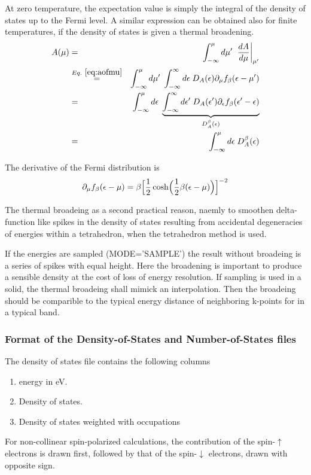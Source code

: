\documentclass[final,12pt]{article}
\begin{document}
{{{{{{At zero  temperature, the expectation  value is simply the  integral of
the density of states up to  the Fermi level. A similar expression can
be obtained also for finite temperatures,  if the density of states is
given a thermal broadening.
\begin{eqnarray}
A(\mu)
&=&\int_{-\infty}^\mu d\mu'\;\left.\frac{dA}{d\mu}\right|_{\mu'}
\nonumber\\
&\stackrel{Eq.~\ref{eq:aofmu}}{=}&
\int_{-\infty}^\mu d\mu'\;
\int_{-\infty}^\infty d\epsilon\; D_A(\epsilon) \partial_\mu 
f_\beta(\epsilon-\mu')
\nonumber\\
&=&\int_{-\infty}^\mu d\epsilon\;
\underbrace{
\int_{-\infty}^\infty d\epsilon'\; D_A(\epsilon') \partial_\epsilon 
f_\beta(\epsilon'-\epsilon)}
_{D_A^{\beta}(\epsilon)}
\nonumber\\
&=&\int_{-\infty}^\mu d\epsilon\;D^\beta_A(\epsilon)
\end{eqnarray}

The derivative of the Fermi distribution is
\begin{eqnarray}
\partial_\mu f_\beta(\epsilon-\mu)
=\beta\Bigl[\frac{1}{2}
\cosh\Bigl(\frac{1}{2}\beta(\epsilon-\mu)\Bigr)\Bigr]^{-2}
\end{eqnarray}

The thermal broadeing as a second practical reason, naemly to smoothen
delta-function like spikes in the density of states resulting from
accidental degeneracies of energies within a tetrahedron, when the
tetrahedron method is used.

If the energies are sampled (MODE='SAMPLE') the result without
broadeing is a series of spikes with equal height. Here the broadening
is important to produce a sensible density at the cost of loss of
energy resolution. If sampling is used in a solid, the thermal
broadeing shall mimick an interpolation. Then the broadeing should be
comparible to the typical energy distance of neighboring k-points for
in a typical band.

\subsubsection{Format of the Density-of-States and Number-of-States files}
\label{sec:formatdosfile}
The density of states file contains the following columns
\begin{enumerate}
\item energy in eV.
\item Density of states. 
\item Density of states weighted with occupations 
\end{enumerate}
For non-collinear spin-polarized calculations, the 
contribution of the spin-$\uparrow$ electrons is drawn first, followed
by that of the spin-$\downarrow$ electrons, drawn with opposite sign. 

}}}}}}
\end{document}
